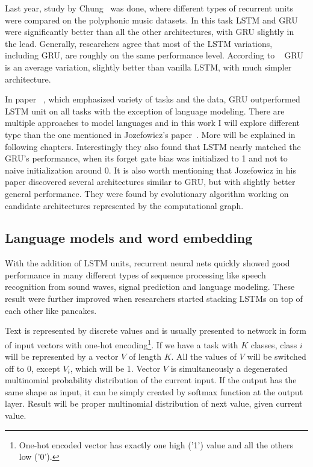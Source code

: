 Last year, study by Chung~\cite{DBLP:journals/corr/ChungGCB14} was done, where different types of recurrent units were compared on the polyphonic music datasets. In this task LSTM and GRU were significantly better than all the other architectures, with GRU slightly in the lead. Generally, researchers agree that most of the LSTM variations, including GRU, are roughly on the same performance level. According to ~\cite{DBLP:journals/corr/GreffSKSS15} GRU is an average variation, slightly better than vanilla LSTM, with much simpler architecture.

In paper ~\cite{DBLP:conf/icml/JozefowiczZS15}, which emphasized variety of tasks and the data, GRU outperformed LSTM unit on all tasks with the exception of language modeling. There are multiple approaches to model languages and in this work I will explore different type than the one mentioned in Jozefowicz's paper~\cite{DBLP:conf/icml/JozefowiczZS15}. More will be explained in following chapters. Interestingly they also found that LSTM nearly matched the GRU's performance, when its forget gate bias was initialized to 1 and not to naive initialization around 0.
It is also worth mentioning that Jozefowicz in his paper discovered several architectures similar to GRU, but with slightly better general performance. They were found by evolutionary algorithm working on candidate architectures  represented by the computational graph.


		\subsection{Language models and word embedding}\label{subsec:lmAndEmbedd}

With the addition of LSTM units, recurrent neural nets quickly showed good performance in many different types of sequence processing like speech recognition from sound waves, signal prediction and language modeling. These result were further improved when researchers started stacking LSTMs on top of each other like pancakes.

Text is represented by discrete values and is usually presented to network in form of input vectors with one-hot encoding\footnote{One-hot encoded vector has exactly one high ('1') value and all the others low ('0').}. If we have a task with $ K $ classes, class $ i $ will be represented by a vector $ V $ of length $ K $. All the values of $ V $ will be switched off to 0, except $ V_i $, which will be 1. Vector $ V $ is simultaneously a degenerated multinomial probability distribution of the current input. If the output has the same shape as input, it can be simply created by softmax function at the output layer. Result will be proper multinomial distribution of next value, given current value.

